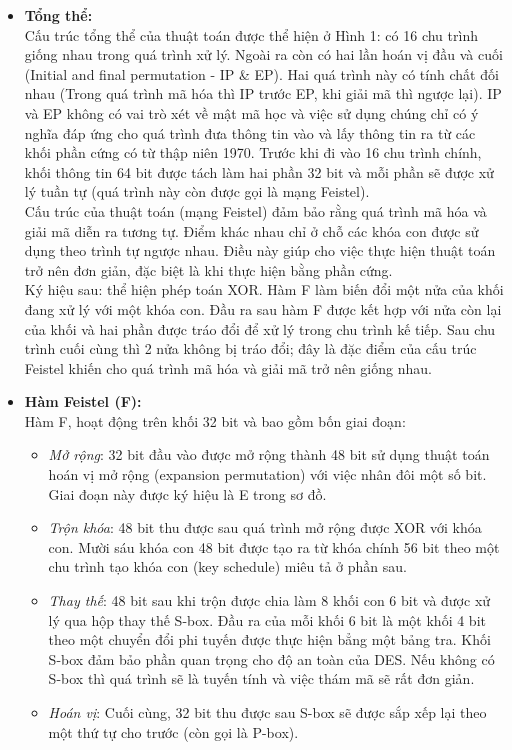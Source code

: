 \documentclass[paper=a4, fontsize=11pt]{scrartcl}	%
\numberwithin{equation}{section}															%
\numberwithin{figure}{section}																%
\numberwithin{table}{section}																%
\begin{document}
\begin{itemize}
    \item \textbf{Tổng thể:}\\[0.1cm]
   
 Cấu trúc tổng thể của thuật toán được thể hiện ở Hình 1: có 16 chu trình giống nhau trong quá trình xử lý. Ngoài ra còn có hai lần hoán vị đầu và cuối (Initial and final permutation - IP & EP). Hai quá trình này có tính chất đối nhau (Trong quá trình mã hóa thì IP trước EP, khi giải mã thì ngược lại). IP và EP không có vai trò xét về mật mã học và việc sử dụng chúng chỉ có ý nghĩa đáp ứng cho quá trình đưa thông tin vào và lấy thông tin ra từ các khối phần cứng có từ thập niên 1970. Trước khi đi vào 16 chu trình chính, khối thông tin 64 bit được tách làm hai phần 32 bit và mỗi phần sẽ được xử lý tuần tự (quá trình này còn được gọi là mạng Feistel).\\[0.1cm]
Cấu trúc của thuật toán (mạng Feistel) đảm bảo rằng quá trình mã hóa và giải mã diễn ra tương tự. Điểm khác nhau chỉ ở chỗ các khóa con được sử dụng theo trình tự ngược nhau. Điều này giúp cho việc thực hiện thuật toán trở nên đơn giản, đặc biệt là khi thực hiện bằng phần cứng.\\[0.1cm]
 Ký hiệu sau: thể hiện phép toán XOR. Hàm F làm biến đổi một nửa của khối đang xử lý với một khóa con. Đầu ra sau hàm F được kết hợp với nửa còn lại của khối và hai phần được tráo đổi để xử lý trong chu trình kế tiếp. Sau chu trình cuối cùng thì 2 nửa không bị tráo đổi; đây là đặc điểm của cấu trúc Feistel khiến cho quá trình mã hóa và giải mã trở nên giống nhau.\\
    
    \item \textbf{Hàm Feistel (F):}\\[0.1cm]
    Hàm F, hoạt động trên khối 32 bit và bao gồm bốn giai đoạn:\\
    \begin{itemize}
        \item \emph{Mở rộng}: 32 bit đầu vào được mở rộng thành 48 bit sử dụng thuật toán hoán vị mở rộng (expansion permutation) với việc nhân đôi một số bit. Giai đoạn này được ký hiệu là E trong sơ đồ. \item \emph{Trộn khóa}: 48 bit thu được sau quá trình mở rộng được XOR với khóa con. Mười sáu khóa con 48 bit được tạo ra từ khóa chính 56 bit theo một chu trình tạo khóa con (key schedule) miêu tả ở phần sau.
        \item \emph{Thay thế}: 48 bit sau khi trộn được chia làm 8 khối con 6 bit và được xử lý qua hộp thay thế S-box. Đầu ra của mỗi khối 6 bit là một khối 4 bit theo một chuyển đổi phi tuyến được thực hiện bẳng một bảng tra. Khối S-box đảm bảo phần quan trọng cho độ an toàn của DES. Nếu không có S-box thì quá trình sẽ là tuyến tính và việc thám mã sẽ rất đơn giản.
        \item \emph{Hoán vị}: Cuối cùng, 32 bit thu được sau S-box sẽ được sắp xếp lại theo một thứ tự cho trước (còn gọi là P-box).
        

\end{itemize}
\end{itemize}
\end{document}
